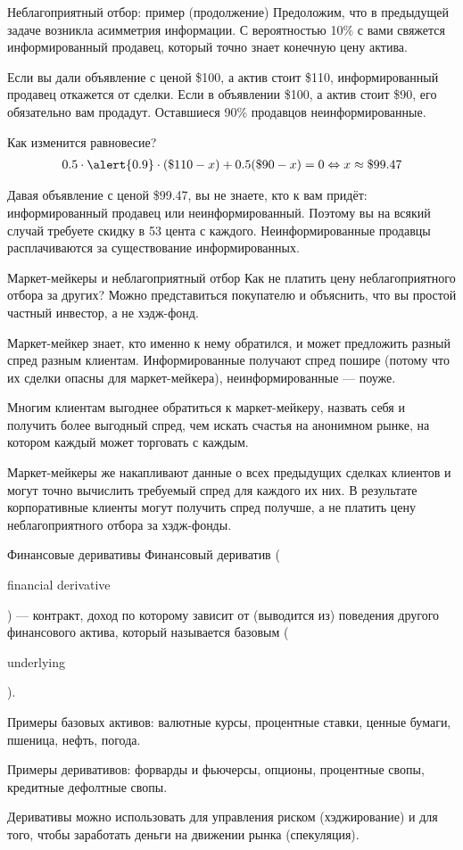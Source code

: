 \documentclass{beamer}
\newcommand{\en}[1]{\begin{otherlanguage}{english}#1\end{otherlanguage}}
\begin{document}
\begin{frame}{Неблагоприятный отбор: пример (продолжение)}
\justify
Предоложим, что в предыдущей задаче возникла асимметрия информации. С 
вероятностью 10\% с вами свяжется информированный продавец, который точно знает
конечную цену актива.

\justify
Если вы дали объявление с ценой \$100, а актив стоит \$110, информированный 
продавец откажется от сделки. Если в объявлении \$100, а актив стоит \$90, его
обязательно вам продадут. Оставшиеся 90\% продавцов неинформированные.

\justify
Как изменится равновесие?
\begin{align*}
0.5\cdot\alert{0.9}\cdot(\$110 - x) + 0.5(\$90 - x) = 0 \Leftrightarrow x \approx \$99.47
\end{align*}

\justify
Давая объявление с ценой \$99.47, вы не знаете, кто к вам придёт: информированный 
продавец или неинформированный. Поэтому вы на всякий случай требуете скидку в 53 
цента с каждого. Неинформированные продавцы расплачиваются за существование информированных.
\end{frame}



\begin{frame}{Маркет-мейкеры и неблагоприятный отбор}
\justify
Как не платить цену неблагоприятного отбора за других? Можно 
представиться покупателю и объяснить, что вы простой частный инвестор, а не хэдж-фонд.

\justify
Маркет-мейкер знает, кто именно к нему обратился, и может предложить разный спред разным клиентам. Информированные получают спред пошире (потому что их сделки опасны для маркет-мейкера), неинформированные --- поуже.

\justify
Многим клиентам выгоднее обратиться к маркет-мейкеру, назвать себя и 
получить более выгодный спред, чем искать счастья на анонимном рынке, на котором
каждый может торговать с каждым.

\justify
Маркет-мейкеры же накапливают данные о всех предыдущих сделках клиентов и
могут точно вычислить требуемый спред для каждого их них. В результате корпоративные клиенты могут получить спред получше, а не платить цену неблагоприятного отбора за хэдж-фонды.
\end{frame}



\begin{frame}{Финансовые деривативы}
\justify
\alert{Финансовый дериватив} (\en{financial derivative}) --- контракт, доход по которому зависит 
от (выводится из) поведения другого финансового актива, который называется базовым 
(\en{underlying}).

\justify
Примеры базовых активов: валютные курсы, процентные ставки, ценные бумаги, пшеница, нефть, погода.

\justify
Примеры деривативов: форварды и фьючерсы, опционы, процентные свопы, кредитные дефолтные свопы.

\justify
Деривативы можно использовать для управления риском (хэджирование) и для того, чтобы заработать деньги на движении рынка (спекуляция). 
\end{frame}
\end{document}

